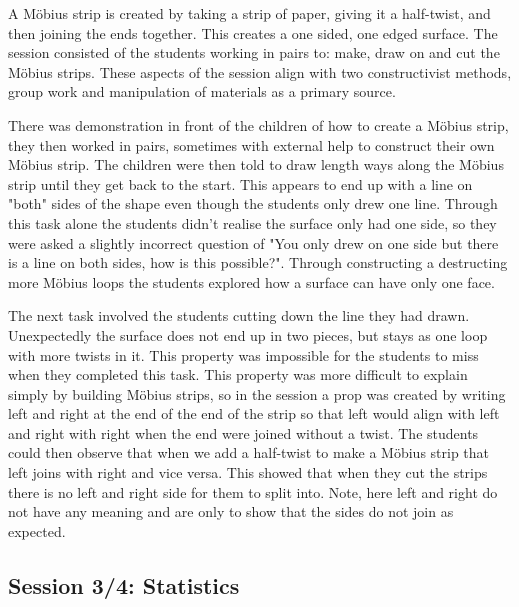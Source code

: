 \documentclass[11pt, a4paper, notitlepage]{article}
\begin{document}
A M\"obius strip is created by taking a strip of paper, giving it a half-twist, and then joining the ends together. This creates a one sided, one edged surface. The session consisted of the students working in pairs to: make, draw on and cut the M\"obius strips. These aspects of the session align with two constructivist methods, group work and manipulation of materials as a primary source. 
\par
There was demonstration in front of the children of how to create a M\"obius strip, they then worked in pairs, sometimes with external help to construct their own M\"obius strip. The children were then told to draw length ways along the M\"obius strip until they get back to the start. This appears to end up with a line on "both" sides of the shape even though the students only drew one line. Through this task alone the students didn't realise the surface only had one side, so they were asked a slightly incorrect question of "You only drew on one side but there is a line on both sides, how is this possible?". Through constructing a destructing more M\"obius loops the students explored how a surface can have only one face.
\par
The next task involved the students cutting down the line they had drawn. Unexpectedly the surface does not end up in two pieces, but stays as one loop with more twists in it. This property was impossible for the students to miss when they completed this task. This property was more difficult to explain simply by building M\"obius strips, so in the session a prop was created by writing left and right at the end of the end of the strip so that left would align with left and right with right when the end were joined without a twist. The students could then observe that when we add a half-twist to make a M\"obius strip that left joins with right and vice versa. This showed that when they cut the strips there is no left and right side for them to split into. Note, here left and right do not have any meaning and are only to show that the sides do not join as expected. 

\subsection{Session 3/4: Statistics}
\end{document}
